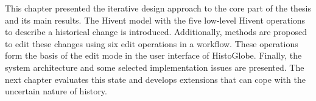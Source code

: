 

\newpage

This chapter presented the iterative design approach to the core part of the thesis and its main results. The Hivent model with the five low-level Hivent operations to describe a historical change is introduced. Additionally, methods are proposed to edit these changes using six edit operations in a workflow.
These operations form the basis of the edit mode in the user interface of HistoGlobe. Finally, the system architecture and some selected implementation issues are presented. The next chapter evaluates this state and develops extensions that can cope with the uncertain nature of history.
